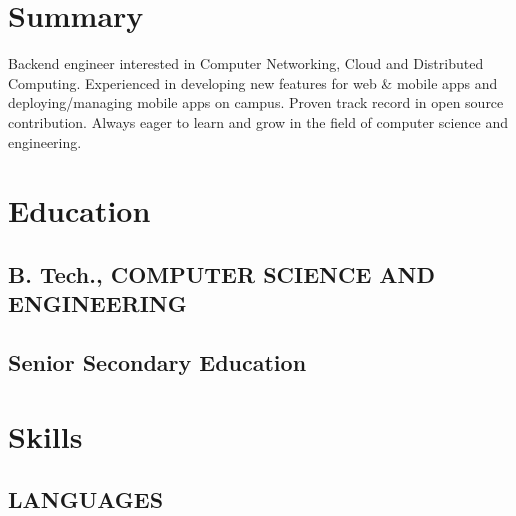 \documentclass[letterpaper]{deedy-resume} %
\begin{document}
\begin{minipage}[t]{0.33\textwidth} %


\section{Summary}
Backend engineer interested in Computer Networking, Cloud and Distributed Computing. Experienced in developing new features for web \& mobile apps and deploying/managing mobile apps on campus. Proven track record in open source contribution. Always eager to learn and grow in the field of computer science and engineering.
\sectionspace %



\section{Education} 


\subsection{B. Tech., COMPUTER SCIENCE AND ENGINEERING }

\sectionspace %

\subsection{Senior Secondary Education}
\sectionspace %


\section{Skills}
\subsection{LANGUAGES}

\end{minipage}
\end{document}
